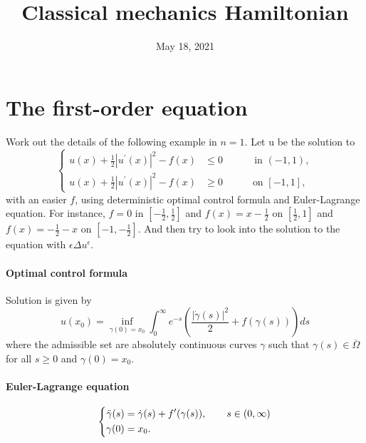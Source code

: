 \documentclass[english,reqno]{amsart}
\title{Classical mechanics Hamiltonian}
\begin{document}
\maketitle
\date{May 18, 2021}
\section{The first-order equation}\noindent
Work out the details of the following example in $n=1$. Let u be the solution to
    \begin{equation}
    \label{example}
        \left\{
  \begin{aligned}
   u(x) + \frac{1}{2}|u^\prime(x)|^2 -f(x) &\leq 0 \, \quad \qquad \text{in } (-1, 1), \\
              u(x) + \frac{1}{2}|u^\prime (x)|^2 -f(x) &\geq 0 \qquad  \quad \text{on } [-1,1],
  \end{aligned}
\right.
    \end{equation}
with an easier $f$, using deterministic optimal control formula and Euler-Lagrange equation. For instance, $f=0$ in $[-\frac{1}{2}, \frac{1}{2}]$ and $f(x) = x-\frac{1}{2}$ on $[\frac{1}{2},1]$ and $f(x) = -\frac{1}{2} - x$ on $[-1,-\frac{1}{2}]$.
And then try to look into the solution to the equation with $\epsilon \Delta u^\epsilon$.

\paragraph{\textbf{Optimal control formula}}
\noindent Solution is given by
\begin{equation*}
    u(x_0) = \inf_{\gamma(0)=x_0} \int_0^\infty e^{-s}\left(\frac{|\dot{\gamma}(s)|^2}{2} + f(\gamma(s))\right)ds
\end{equation*}
where the admissible set are absolutely continuous curves $\gamma$ such that $\gamma(s)\in \overline{\Omega}$ for all $s\geq 0$ and $\gamma(0)=x_0$.
    
\paragraph{\textbf{Euler-Lagrange equation}}    
\begin{equation}
\label{EL}
\left\{
\begin{aligned}
     \Ddot{\gamma}(s)&=\dot{\gamma}(s) + f^\prime (\gamma(s)), \qquad s\in (0,\infty)\\
     \gamma(0)&=x_0.
\end{aligned}
\right.
\end{equation}
\end{document}
